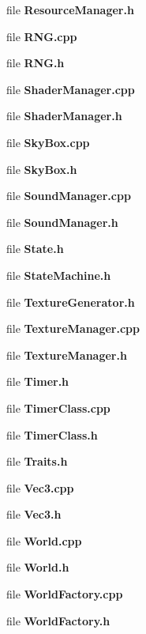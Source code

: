 \begin{DoxyCompactItemize}
\item 
file {\bf Resource\+Manager.\+h}
\item 
file {\bf R\+N\+G.\+cpp}
\item 
file {\bf R\+N\+G.\+h}
\item 
file {\bf Shader\+Manager.\+cpp}
\item 
file {\bf Shader\+Manager.\+h}
\item 
file {\bf Sky\+Box.\+cpp}
\item 
file {\bf Sky\+Box.\+h}
\item 
file {\bf Sound\+Manager.\+cpp}
\item 
file {\bf Sound\+Manager.\+h}
\item 
file {\bf State.\+h}
\item 
file {\bf State\+Machine.\+h}
\item 
file {\bf Texture\+Generator.\+h}
\item 
file {\bf Texture\+Manager.\+cpp}
\item 
file {\bf Texture\+Manager.\+h}
\item 
file {\bf Timer.\+h}
\item 
file {\bf Timer\+Class.\+cpp}
\item 
file {\bf Timer\+Class.\+h}
\item 
file {\bf Traits.\+h}
\item 
file {\bf Vec3.\+cpp}
\item 
file {\bf Vec3.\+h}
\item 
file {\bf World.\+cpp}
\item 
file {\bf World.\+h}
\item 
file {\bf World\+Factory.\+cpp}
\item 
file {\bf World\+Factory.\+h}
\end{DoxyCompactItemize}
